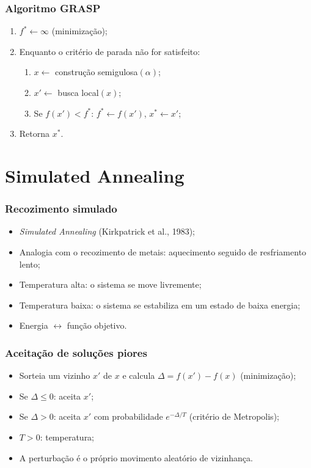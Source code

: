 \documentclass[fleqn]{beamer}
\begin{document}
\begin{frame}
	\frametitle{Algoritmo GRASP}
	\begin{enumerate}
		\item $f^* \leftarrow \infty$ (minimização);
		\item Enquanto o critério de parada não for satisfeito:
		\begin{enumerate}
			\item $x \leftarrow$ construção semigulosa$(\alpha)$;
			\item $x' \leftarrow$ busca local$(x)$;
			\item Se $f(x') < f^*$: $f^* \leftarrow f(x')$, $x^* \leftarrow x'$;
		\end{enumerate}
		\item Retorna $x^*$.
	\end{enumerate}
\end{frame}

\section{Simulated Annealing}

\begin{frame}
	\frametitle{Recozimento simulado}
	\begin{itemize}
		\item \textit{Simulated Annealing} (Kirkpatrick et al., 1983);
		\item Analogia com o recozimento de metais: aquecimento seguido de
			resfriamento lento;
		\item Temperatura alta: o sistema se move livremente;
		\item Temperatura baixa: o sistema se estabiliza em um estado de
			baixa energia;
		\item Energia $\leftrightarrow$ função objetivo.
	\end{itemize}
\end{frame}

\begin{frame}
	\frametitle{Aceitação de soluções piores}
	\begin{itemize}
		\item Sorteia um vizinho $x'$ de $x$ e calcula
			$\Delta = f(x') - f(x)$ (minimização);
		\item Se $\Delta \leq 0$: aceita $x'$;
		\item Se $\Delta > 0$: aceita $x'$ com probabilidade
			$e^{-\Delta/T}$ (critério de Metropolis);
		\item $T > 0$: temperatura;
		\item A perturbação é o próprio movimento aleatório de vizinhança.
	\end{itemize}
\end{frame}
\end{document}
